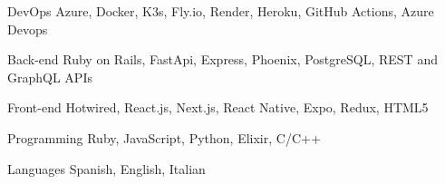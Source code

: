

\begin{cvskills}

  \cvskill
    {DevOps} %
    {Azure, Docker, K3s, Fly.io, Render, Heroku, GitHub Actions, Azure Devops} %

  \cvskill
    {Back-end} %
    {Ruby on Rails, FastApi, Express, Phoenix, PostgreSQL, REST and GraphQL APIs} %

  \cvskill
    {Front-end} %
    {Hotwired, React.js, Next.js, React Native, Expo, Redux, HTML5} %

  \cvskill
    {Programming} %
    {Ruby, JavaScript, Python, Elixir, C/C++} %

  \cvskill
    {Languages} %
    {Spanish, English, Italian} %

\end{cvskills}
